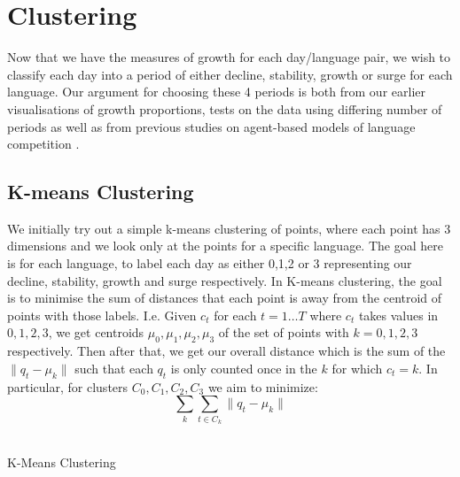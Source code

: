 \documentclass[12pt]{article}
\makeatletter
\def\BState{\State\hskip-\ALG@thistlm}
\makeatother
\begin{document}
\section{Clustering}
Now that we have the measures of growth for each day/language pair, we wish to classify each day into a period of either decline, stability, growth or surge for each language. Our argument for choosing these 4 periods is both from our earlier visualisations of growth proportions, tests on the data using differing number of periods as well as from previous studies on agent-based models of language competition \cite{competition, competition2, competition3}.
\subsection{K-means Clustering}
We initially try out a simple k-means clustering of points, where each point has 3 dimensions and we look only at the points for a specific language. The goal here is for each language, to label each day as either 0,1,2 or 3 representing our decline, stability, growth and surge respectively. In K-means clustering, the goal is to minimise the sum of distances that each point is away from the centroid of points with those labels. I.e. Given $c_t$ for each $t=1 \ldots T$ where $c_t$ takes values in $0,1,2,3$, we get centroids $\mu_0,\mu_1,\mu_2,\mu_3$ of the set of points with $k=0,1,2,3$ respectively. Then after that, we get our overall distance which is the sum of the $\lVert q_t - \mu_k \rVert $ such that each $q_t$ is only counted once in the $k$ for which $c_t = k$. In particular, for clusters $C_0,C_1,C_2,C_3$ we aim to minimize: $$\sum_k\sum_{t \in C_k} \lVert q_t - \mu_k \rVert $$
\\
\FloatBarrier
\begin{algorithm}
\caption{K-Means Clustering}
\end{algorithm}
\end{document}

